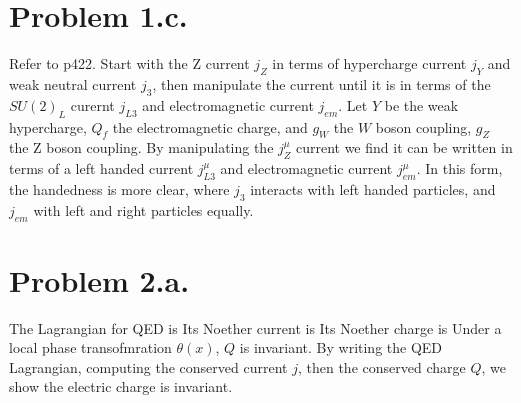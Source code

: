 \documentclass{article}
\begin{document}
\section*{Problem 1.c.}
Refer to \cite{thom} p422. Start with the Z current $j_Z$ in terms of hypercharge current $j_Y$ and weak neutral current $j_3$, then manipulate the current until it is in terms of the $SU(2)_L$ curernt $j_{L3}$ and electromagnetic current $j_{em}$. Let $Y$ be the weak hypercharge, $Q_f$ the electromagnetic charge, and $g_W$ the $W$ boson coupling, $g_Z$ the Z boson coupling.
By manipulating the $j^\mu_Z$ current we find it can be written in terms of a left handed current $j^\mu_{L3}$ and electromagnetic current $j^\mu_{em}$. In this form, the handedness is more clear, where $j_3$ interacts with left handed particles, and $j_{em}$ with left and right particles equally. 
\section*{Problem 2.a.}
The Lagrangian for QED is
Its Noether current is
Its Noether charge is
Under a local phase transofmration $\theta(x)$, $Q$ is invariant.
By writing the QED Lagrangian, computing the conserved current $j$, then the conserved charge $Q$, we show the electric charge is invariant.
\end{document}
